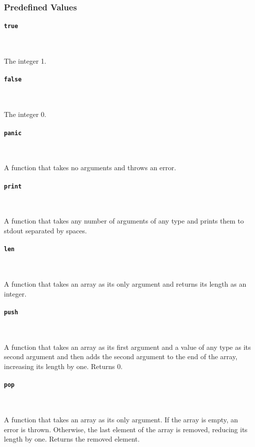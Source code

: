 \subsubsection{Predefined Values}

\paragraph{\texttt{true}} \

The integer 1.

\paragraph{\texttt{false}} \

The integer 0.

\paragraph{\texttt{panic}} \

A function that takes no arguments and throws an error.

\paragraph{\texttt{print}} \

A function that takes any number of arguments of any type and prints them to stdout separated by spaces.

\paragraph{\texttt{len}} \

A function that takes an array as its only argument and returns its length as an integer.

\paragraph{\texttt{push}} \

A function that takes an array as its first argument and a value of any type as its second argument and then adds the second argument to the end of the array, increasing its length by one. Returns 0.

\paragraph{\texttt{pop}} \

A function that takes an array as its only argument. If the array is empty, an error is thrown. Otherwise, the last element of the array is removed, reducing its length by one. Returns the removed element.

